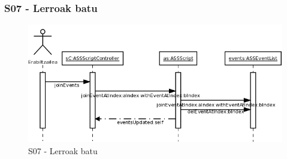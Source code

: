 \subsubsection{S07 - Lerroak batu}
\begin{figure}[htp]
\begin{center}
\includegraphics[scale=0.35]{Pictures/Chapter4/Diseinua/S07.png}
\caption{S07 - Lerroak batu}
\label{s07d}
\end{center}
\end{figure}

\newpage
